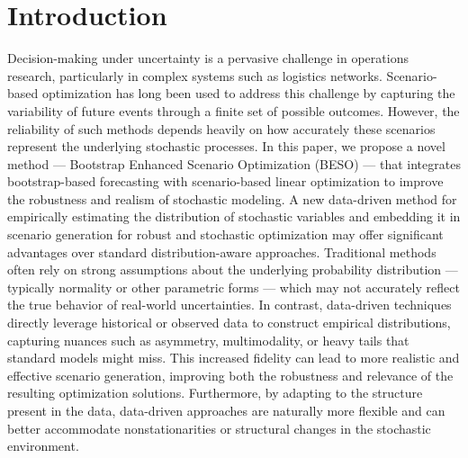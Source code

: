 \documentclass[ijoc,sglanonrev]{informs4}
\begin{document}


\maketitle



\section{Introduction} \label{Sec:intro}

Decision-making under uncertainty is a pervasive challenge in operations research, particularly in complex systems such as logistics networks. Scenario-based optimization has long been used to address this challenge by capturing the variability of future events through a finite set of possible outcomes. However, the reliability of such methods depends heavily on how accurately these scenarios represent the underlying stochastic processes. In this paper, we propose a novel method — Bootstrap Enhanced Scenario Optimization (BESO) — that integrates bootstrap-based forecasting with scenario-based linear optimization to improve the robustness and realism of stochastic modeling. A new data-driven method for empirically estimating the distribution of stochastic variables and embedding it in scenario generation for robust and stochastic optimization may offer significant advantages over standard distribution-aware approaches. Traditional methods often rely on strong assumptions about the underlying probability distribution — typically normality or other parametric forms — which may not accurately reflect the true behavior of real-world uncertainties. In contrast, data-driven techniques directly leverage historical or observed data to construct empirical distributions, capturing nuances such as asymmetry, multimodality, or heavy tails that standard models might miss. This increased fidelity can lead to more realistic and effective scenario generation, improving both the robustness and relevance of the resulting optimization solutions. Furthermore, by adapting to the structure present in the data, data-driven approaches are naturally more flexible and can better accommodate nonstationarities or structural changes in the stochastic environment.
\end{document}
